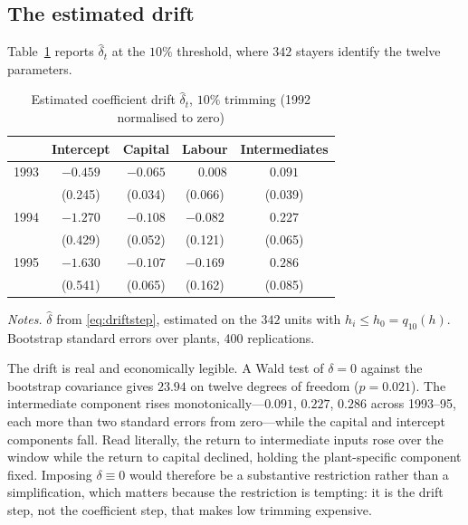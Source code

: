 \subsection{The estimated drift}
\label{sec:drift}

Table~\ref{tab:drift} reports $\hat\delta_t$ at the $10\%$ threshold, where
$342$ stayers identify the twelve parameters.

\begin{table}[t]
\centering
\caption{Estimated coefficient drift $\hat\delta_t$, $10\%$ trimming
(1992 normalised to zero)}
\label{tab:drift}
\begin{tabular}{lcccc}
\toprule
& Intercept & Capital & Labour & Intermediates \\
\midrule
1993 & $-0.459$ & $-0.065$ & $\phantom{-}0.008$ & $0.091$ \\
     & (0.245) & (0.034) & (0.066) & (0.039) \\
1994 & $-1.270$ & $-0.108$ & $-0.082$ & $0.227$ \\
     & (0.429) & (0.052) & (0.121) & (0.065) \\
1995 & $-1.630$ & $-0.107$ & $-0.169$ & $0.286$ \\
     & (0.541) & (0.065) & (0.162) & (0.085) \\
\bottomrule
\end{tabular}

\vspace{0.6em}
\begin{minipage}{0.92\textwidth}
\footnotesize \emph{Notes.} $\hat\delta$ from \eqref{eq:driftstep}, estimated
on the $342$ units with $h_i \leq h_0 = q_{10}(h)$. Bootstrap standard errors
over plants, 400 replications.
\end{minipage}
\end{table}

The drift is real and economically legible. A Wald test of $\delta = 0$ against
the bootstrap covariance gives $23.94$ on twelve degrees of freedom
($p = 0.021$). The intermediate component rises monotonically---$0.091$,
$0.227$, $0.286$ across 1993--95, each more than two standard errors from
zero---while the capital and intercept components fall. Read literally, the
return to intermediate inputs rose over the window while the return to capital
declined, holding the plant-specific component fixed. Imposing
$\delta \equiv 0$ would therefore be a substantive restriction rather than a
simplification, which matters because the restriction is tempting: it is the
drift step, not the coefficient step, that makes low trimming expensive.

